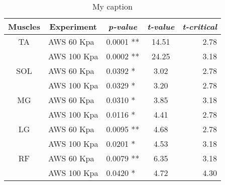 \documentclass[letterpaper, 10 pt, conference]{ieeeconf}  %
\begin{document}
\begin{table}[]
	\centering
	\caption{My caption}
	\label{my-label}
	\begin{tabular}{@{}cllcr@{}}
		\toprule
		\textbf{Muscles} & \multicolumn{1}{c}{\textbf{Experiment}} & \multicolumn{1}{c}{\textit{\textbf{p-value}}} & \textit{\textbf{t-value}} & \multicolumn{1}{c}{\textit{\textbf{t-critical}}} \\ \midrule
		TA               & AWS 60 Kpa                              & 0.0001 **                                     & 14.51                     & 2.78                                             \\
		& AWS 100 Kpa                             & 0.0002 **                                     & 24.25                     & 3.18                                             \\
		SOL              & AWS 60 Kpa                              & 0.0392 *                                      & 3.02                      & 2.78                                             \\
		& AWS 100 Kpa                             & 0.0329 *                                      & 3.20                      & 2.78                                             \\
		MG               & AWS 60 Kpa                              & 0.0310 *                                      & 3.85                      & 3.18                                             \\
		& AWS 100 Kpa                             & 0.0116 *                                      & 4.41                      & 2.78                                             \\
		LG               & AWS 60 Kpa                              & 0.0095 **                                     & 4.68                      & 2.78                                             \\
		& AWS 100 Kpa                             & 0.0201 *                                      & 4.53                      & 3.18                                             \\
		RF               & AWS 60 Kpa                              & 0.0079 **                                     & 6.35                      & 3.18                                             \\
		& AWS 100 Kpa                             & 0.0420 *                                      & 4.72                      & 4.30                                             \\

\end{tabular}
\end{table}
\end{document}
